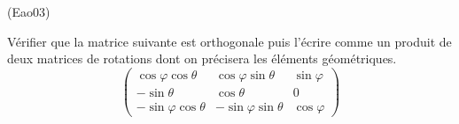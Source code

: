 \begin{tiny}(Eao03)\end{tiny}
Vérifier que la matrice suivante est orthogonale puis l'écrire comme un produit de deux matrices de rotations dont on précisera les éléments géométriques.
\[
\begin{pmatrix}
\cos \varphi \cos \theta & \cos \varphi \sin \theta & \sin \varphi \\ 
-\sin \theta & \cos \theta & 0 \\ 
-\sin \varphi \cos \theta & -\sin \varphi \sin \theta & \cos \varphi
\end{pmatrix}   
\]